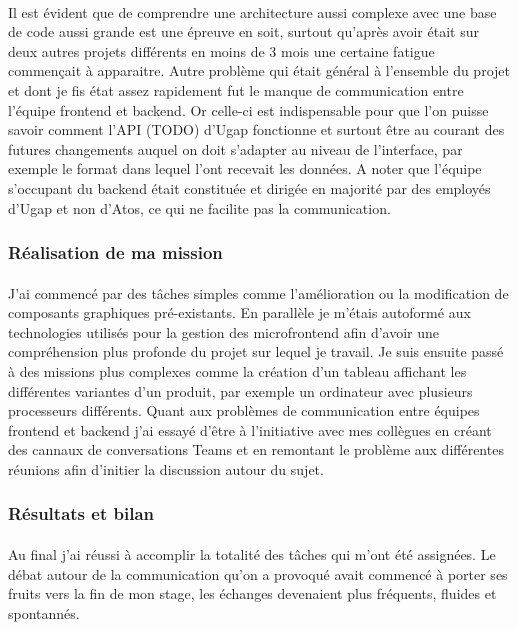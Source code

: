 \documentclass[12pt]{article}
\begin{document}
\begin {sloppypar}
\paragraph{}
Il est évident que de comprendre une architecture aussi complexe avec une base de code aussi grande 
est une épreuve en soit, surtout qu'après avoir était sur deux autres projets différents en moins de 3 mois
une certaine fatigue commençait à apparaitre. Autre problème qui était général à l'ensemble du projet
et dont je fis état assez rapidement fut le manque de communication entre l'équipe frontend et backend. 
Or celle-ci est indispensable pour que l'on puisse savoir comment l'API (TODO) d'Ugap fonctionne et
surtout être au courant des futures changements auquel on doit s'adapter au niveau de l'interface,
par exemple le format dans lequel l'ont recevait les données. A noter que l'équipe s'occupant du 
backend était constituée et dirigée en majorité par des employés d'Ugap et non d'Atos, ce qui ne 
facilite pas la communication.
\subsubsection{Réalisation de ma mission}
\paragraph{}
J'ai commencé par des tâches simples comme l'amélioration ou la modification de composants graphiques
pré-existants. En parallèle je m'étais autoformé aux technologies utilisés pour la gestion des microfrontend 
afin d'avoir une compréhension plus profonde du projet sur lequel je travail. Je suis ensuite passé à des missions 
plus complexes comme la création d'un tableau affichant les différentes variantes d'un produit, par exemple
un ordinateur avec plusieurs processeurs différents. Quant aux problèmes de communication entre équipes frontend 
et backend j'ai essayé d'être à l'initiative avec mes collègues en créant des cannaux de conversations Teams 
et en remontant le problème aux différentes réunions afin d'initier la discussion autour du sujet.

\subsubsection{Résultats et bilan}
\paragraph{}
Au final j'ai réussi à accomplir la totalité des tâches qui m'ont été assignées. Le débat autour de la communication 
qu'on a provoqué avait commencé à porter ses fruits vers la fin de mon stage, les échanges devenaient plus 
fréquents, fluides et spontannés. 

\end{sloppypar}
\end{document}
